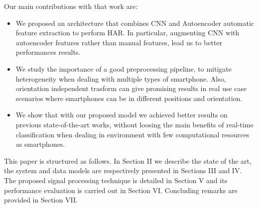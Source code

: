 Our main contributions with that work are:
\begin{itemize}
	\item We proposed an architecture that combines CNN and Autoencoder automatic feature extraction to perform HAR. In particular, augmenting CNN with autoencoder features rather than manual features, lead us to better performances results.
	\item We study the importance of a good preprocessing pipeline, to mitigate heterogeneity when dealing with multiple types of smartphone. Also, orientation independent trasform can give promising results in real use case scenarios where smartphones can be in different positions and orientation.
	\item We show that with our proposed model we achieved better results on previous state-of-the-art works, without loosing the main benefits of real-time classification when dealing in environment with few computational resources as smartphones.
\end{itemize}

This paper is structured as follows. In Section II we describe the state of the art, the system and data models are respectively presented in Sections III and IV. The proposed signal processing technique is detailed in Section V and its performance evaluation is carried out in Section VI. Concluding remarks are provided in Section VII. 






